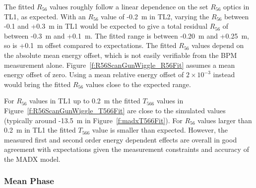 The fitted \(R_{56}\) values roughly follow a linear dependence on the set \(R_{56}\) optics in TL1, as expected. With an \(R_{56}\) value of -0.2~m in TL2, varying the \(R_{56}\) between -0.1 and +0.3~m in TL1 would be expected to give a total residual \(R_{56}\) of between -0.3~m and +0.1~m. The fitted range is between -0.20~m and +0.25~m, so is +0.1~m offset compared to expectations. The fitted \(R_{56}\) values depend on the absolute mean energy offset, which is not easily verifiable from the BPM measurement alone. Figure~\ref{f:R56ScanGunWiggle_R56Fit} assumes a mean energy offset of zero. Using a mean relative energy offset of \(2\times10^{-3}\) instead would bring the fitted \(R_{56}\) values close to the expected range.

For \(R_{56}\) values in TL1 up to 0.2~m the fitted \(T_{566}\) values in Figure~\ref{f:R56ScanGunWiggle_T566Fit} are close to the simulated values (typically around -13.5~m in Figure~\ref{f:madxT566Fit}). For \(R_{56}\) values larger than 0.2~m in TL1 the fitted \(T_{566}\) value is smaller than expected. However, the measured first and second order energy dependent effects are overall in good agreement with expectations given the measurement constraints and accuracy of the MADX model.


\subsubsection{Mean Phase}


